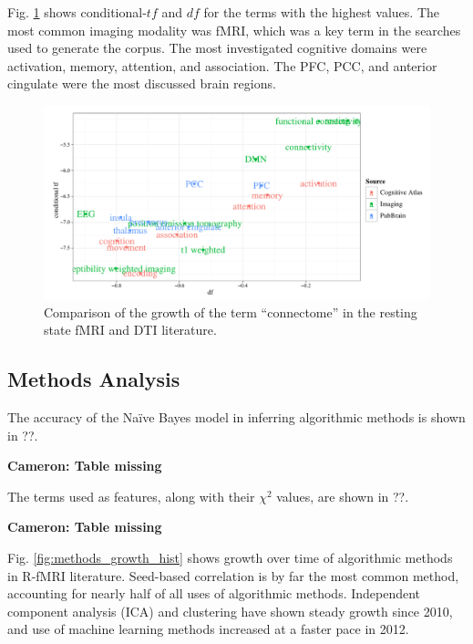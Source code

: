 \documentclass[5p]{elsarticle}
\newcommand\MyCBox[1]{%
  \colorbox{yellow!60}{\begin{varwidth}{\dimexpr\linewidth-2\fboxsep}#1\end{varwidth}}}
\newcommand{\COMMENTCC}[1]{\MyCBox{\textcolor{cc_commentcolor}{\textbf{Cameron:
#1}}}}
\begin{document}
Fig. \ref{fig:tfidf_top2} shows conditional-$t\!f$ and $d\!f$ for the terms with
the highest values. The most common imaging modality was fMRI, which was a key
term in the searches used to generate the corpus. The most investigated
cognitive domains were activation, memory, attention, and association. The PFC,
PCC, and anterior cingulate were the most discussed brain regions. 

\begin{figure}
  \begin{center}
    \includegraphics[width=\linewidth]{figures/tfidf_top2}%
    \caption{Comparison of the growth of the term ``connectome'' in the resting
    state fMRI and DTI literature.
        \label{fig:tfidf_top2}
    }
  \end{center}
\end{figure}

\subsection{Methods Analysis}

The accuracy of the Na\"ive Bayes model in inferring
algorithmic methods is shown in ??. \COMMENTCC{Table missing}

The terms used as features, along with their $\chi^2$ values, are shown in
??. \COMMENTCC{Table missing}

Fig. \ref{fig:methods_growth_hist} shows growth over time of algorithmic methods
in R-fMRI literature.  Seed-based correlation is by far the most common method,
accounting for nearly half of all uses of algorithmic methods. Independent
component analysis (ICA) and clustering have shown steady growth since 2010, and
use of machine learning methods increased at a faster pace in 2012.
\end{document}
